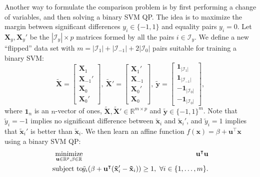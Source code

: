 \documentclass{article}
\newcommand{\RR}{\mathbb R}
\DeclareMathOperator*{\minimize}{minimize}
\begin{document}
Another way to formulate the comparison problem is by first performing
a change of variables, and then solving a binary SVM QP. The idea is
to maximize the margin between significant differences
$y_i\in\{-1,1\}$ and equality pairs $y_i=0$. Let $\mathbf X_y,\mathbf
X_y'$ be the $|\mathcal I_y|\times p$ matrices formed by all the pairs
$i\in \mathcal I_y$. We define a new ``flipped'' data set with
$m=|\mathcal I_1|+|\mathcal I_{-1}|+2|\mathcal I_0|$ pairs suitable
for training a binary SVM:
\begin{equation}
\label{eq:tilde}
\mathbf{  \tilde X} = \left[
    \begin{array}{c}
      \mathbf X_1 \\
      \mathbf X_{-1}'\\
      \mathbf X_0\\
      \mathbf X_0'
    \end{array}
  \right],\ 
  \mathbf{\tilde X'} = \left[
    \begin{array}{c}
      \mathbf X_1' \\
      \mathbf X_{-1}\\
      \mathbf X_0'\\
      \mathbf X_0
    \end{array}
  \right],\ 
  \mathbf{\tilde y} = \left[
    \begin{array}{c}
      \mathbf 1_{|\mathcal I_1|} \\
      \mathbf 1_{|\mathcal I_{-1}|}\\
      \mathbf{-1}_{|\mathcal I_0|}\\
      \mathbf{-1}_{|\mathcal I_0|}
    \end{array}
  \right],
\end{equation}
where $\mathbf 1_n$ is an $n$-vector of ones, $\mathbf{\tilde
  X},\mathbf{\tilde X'}\in\RR^{m\times p}$ and $\mathbf{\tilde
  y}\in\{-1,1\}^m$. Note that $\tilde y_i=-1$ implies no significant
difference between $\mathbf{\tilde x}_i$ and $\mathbf{\tilde x}_i'$,
and $\tilde y_i=1$ implies that $\mathbf{\tilde x}_i'$ is better than
$\mathbf{\tilde x}_i$. We then learn an affine function $f(\mathbf
x)=\beta+\mathbf u^\intercal \mathbf x$ using a binary SVM QP:
\begin{eqnarray}
  \label{eq:max-margin-qp-tilde}
  \minimize_{\mathbf u\in\RR^p, \beta\in\RR}\ &&\hskip -0.5cm
  \mathbf u^\intercal \mathbf u  \\
\nonumber    \text{subject to}\ &&\hskip -0.5cm 
    \tilde y_i (\beta + 
    \mathbf u^\intercal( \mathbf{\tilde x}_i'-\mathbf{\tilde x}_i) ) \geq 1,
    \ \forall i\in\{1,\dots,m\}.
\end{eqnarray}
\end{document}
